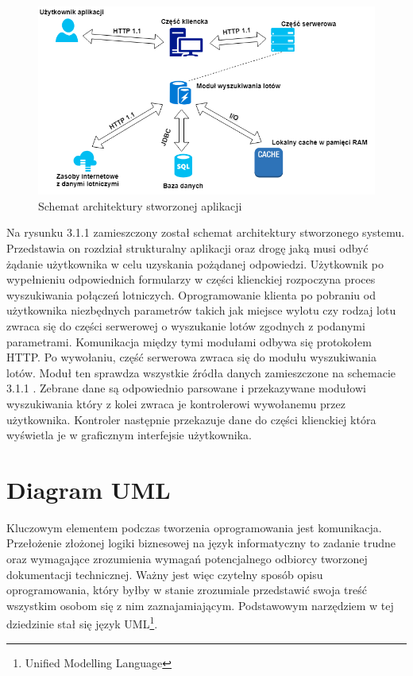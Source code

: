 \documentclass[12pt, twoside]{report}
\begin{document}
\begin{figure}[!ht]
\centering
\includegraphics[scale=0.60, keepaspectratio]{architecure_diagram.png}
\caption{Schemat architektury stworzonej aplikacji}
\label{fig:architecure_diagram}
\end{figure}

\newpage
Na rysunku 3.1.1 zamieszczony został schemat architektury stworzonego systemu. Przedstawia on rozdział strukturalny aplikacji oraz drogę jaką musi odbyć żądanie użytkownika w celu uzyskania pożądanej odpowiedzi. Użytkownik po wypełnieniu odpowiednich formularzy w części klienckiej rozpoczyna proces wyszukiwania połączeń lotniczych. Oprogramowanie klienta po pobraniu od użytkownika niezbędnych parametrów takich jak miejsce wylotu czy rodzaj lotu zwraca się do części serwerowej o wyszukanie lotów zgodnych z podanymi parametrami. Komunikacja między tymi modułami odbywa się protokołem HTTP. Po wywołaniu, część serwerowa zwraca się do modułu wyszukiwania lotów. Moduł ten sprawdza wszystkie źródła danych zamieszczone na schemacie 3.1.1 . Zebrane dane są odpowiednio parsowane i przekazywane modułowi wyszukiwania który z kolei zwraca je kontrolerowi wywołanemu przez użytkownika. Kontroler następnie przekazuje dane do części klienckiej która wyświetla je w  graficznym interfejsie użytkownika. 
\section{Diagram UML}
Kluczowym elementem podczas tworzenia oprogramowania jest komunikacja. Przełożenie złożonej logiki biznesowej na język informatyczny to zadanie trudne oraz wymagające zrozumienia wymagań potencjalnego odbiorcy tworzonej dokumentacji technicznej. Ważny jest więc czytelny sposób opisu oprogramowania, który byłby w stanie zrozumiale przedstawić swoja treść wszystkim osobom się z nim zaznajamiającym. Podstawowym narzędziem w tej dziedzinie stał się język UML\footnote{Unified Modelling Language}.\cite{uml} \\
\end{document}
